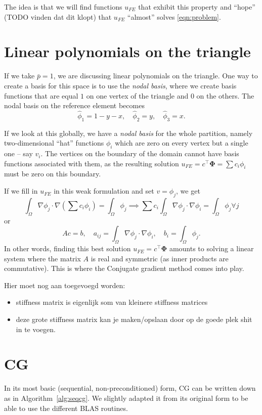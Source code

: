 \documentclass[11pt]{amsart}
\theoremstyle{definition}
\begin{document}
The idea is that we will find functions $u_{FE}$ that exhibit this property and ``hope'' (TODO vinden dat dit klopt) that $u_{FE}$ ``almost'' solves \eqref{eqn:problem}.

\section{Linear polynomials on the triangle}
If we take $\bar p=1$, we are discussing linear polynomials on the triangle. One way to create a basis for this space is to use the \emph{nodal basis}, where we create basis functions that are equal $1$ on one vertex of the triangle and $0$ on the others. The nodal basis on the reference element becomes
\[
  \hat \phi_1 = 1-y-x, \quad \hat \phi_2 = y, \quad \hat \phi_3 = x.
\]

If we look at this globally, we have a \emph{nodal basis} for the whole partition, namely two-dimensional ``hat'' functions $\phi_i$ which are zero on every vertex but a single one -- say $v_i$. The vertices on the boundary of the domain cannot have basis functions associated with them, as the resulting solution $u_{FE} = c^\top \mathbf \Phi = \sum c_i \phi_i$ must be zero on this boundary.

If we fill in $u_{FE}$ in this weak formulation and set $v = \phi_j$, we get
\[
  \int_\Omega \nabla \phi_j \cdot \nabla \left (\sum c_i \phi_i\right) = \int_\Omega \phi_j \implies \sum c_i \int_\Omega \nabla \phi_j \cdot \nabla \phi_i = \int_\Omega \phi_j \forall j
\]
or
\[
  Ac = b, \quad a_{ij} = \int_\Omega \nabla \phi_j \cdot \nabla \phi_i, \quad b_i = \int_\Omega \phi_j.
\]
In other words, finding this best solution $u_{FE} = c^\top \mathbf \Phi$ amounts to solving a linear system where the matrix $A$ is real and symmetric (as inner products are commutative). This is where the Conjugate gradient method comes into play.

Hier moet nog aan toegevoegd worden:
\begin{itemize}
  \item stiffness matrix is eigenlijk som van kleinere stiffness matrices
  \item deze grote stiffness matrix kan je maken/opslaan door op de goede plek shit in te voegen.
\end{itemize}


\section{CG}
In its most basic (sequential, non-preconditioned) form, CG can be written down as in Algorithm~\ref{alg:seqcg}. \cite[Alg.~4.8]{biss04} We slightly adapted it from its original form to be able to use the different BLAS \cite{blas} routines.
\end{document}
